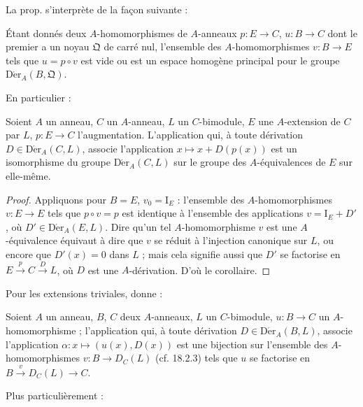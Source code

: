 La prop.  s'interprète de la façon suivante :

\begin{corollary}[20.1.3]
\label{0.20.1.3-fr}
Étant donnés deux $A$-homomorphismes de $A$-anneaux $p:E\to C$,
$u:B\to C$ dont le premier a un noyau $\mathfrak{Q}$ de carré nul,
l'ensemble des $A$-homomorphismes $v:B\to E$ tels que $u=p\circ v$ est vide
ou est un espace homogène principal pour le groupe
$\operatorname{D\acute{e}r}_A(B,\mathfrak{Q})$.
\end{corollary}

En particulier :

\begin{corollary}[20.1.4]
\label{0.20.1.4-fr}
Soient $A$ un anneau, $C$ un $A$-anneau, $L$ un $C$-bimodule, $E$ une
$A$-extension de $C$ par $L$, $p:E\to C$ l'augmentation. L'application qui,
à toute dérivation $D\in\operatorname{D\acute{e}r}_A(C,L)$, associe l'application
$x\mapsto x+D(p(x))$ est un isomorphisme du groupe
$\operatorname{D\acute{e}r}_A(C,L)$ sur le groupe des $A$-équivalences de $E$ sur
elle-même.
\end{corollary}

\begin{proof}
Appliquons  pour $B=E$, $v_0=\mathrm{I}_E$ : l'ensemble
des $A$-homomorphismes $v:E\to E$ tels que $p\circ v=p$ est identique à
l'ensemble des applications $v=\mathrm{I}_E+D'$, où
$D'\in\operatorname{D\acute{e}r}_A(E,L)$. Dire qu'un tel $A$-homomorphisme $v$ est
une $A$-équivalence équivaut à dire que $v$ se réduit à l'injection canonique
sur $L$, ou encore que $D'(x)=0$ dans $L$ ; mais cela signifie aussi que
$D'$ se factorise en $E\xrightarrow{p}C\xrightarrow{D}L$, où $D$ est une
$A$-dérivation. D'où le corollaire.
\end{proof}

Pour les extensions triviales,  donne :

\begin{corollary}[20.1.5]
\label{0.20.1.5-fr}
Soient $A$ un anneau, $B$, $C$ deux $A$-anneaux, $L$ un $C$-bimodule,
$u:B\to C$ un $A$-homomorphisme ; l'application qui, à toute dérivation
$D\in\operatorname{D\acute{e}r}_A(B,L)$, associe l'application
$\alpha:x\mapsto(u(x),D(x))$ est une bijection sur l'ensemble des
$A$-homomorphismes $v:B\to D_C(L)$ (cf. 18.2.3) tels que $u$ se factorise en
$B\xrightarrow{v}D_C(L)\to C$.
\end{corollary}

Plus particulièrement :


